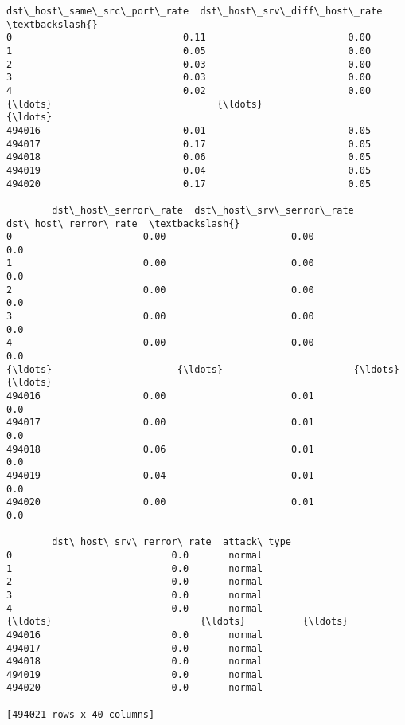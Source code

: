 \documentclass[11pt]{article}
\begin{document}
\begin{tcolorbox}[breakable, size=fbox, boxrule=.5pt, pad at break*=1mm, opacityfill=0]
\begin{Verbatim}[commandchars=\\\{\}]
        dst\_host\_same\_src\_port\_rate  dst\_host\_srv\_diff\_host\_rate  \textbackslash{}
0                              0.11                         0.00
1                              0.05                         0.00
2                              0.03                         0.00
3                              0.03                         0.00
4                              0.02                         0.00
{\ldots}                             {\ldots}                          {\ldots}
494016                         0.01                         0.05
494017                         0.17                         0.05
494018                         0.06                         0.05
494019                         0.04                         0.05
494020                         0.17                         0.05

        dst\_host\_serror\_rate  dst\_host\_srv\_serror\_rate  dst\_host\_rerror\_rate  \textbackslash{}
0                       0.00                      0.00                   0.0
1                       0.00                      0.00                   0.0
2                       0.00                      0.00                   0.0
3                       0.00                      0.00                   0.0
4                       0.00                      0.00                   0.0
{\ldots}                      {\ldots}                       {\ldots}                   {\ldots}
494016                  0.00                      0.01                   0.0
494017                  0.00                      0.01                   0.0
494018                  0.06                      0.01                   0.0
494019                  0.04                      0.01                   0.0
494020                  0.00                      0.01                   0.0

        dst\_host\_srv\_rerror\_rate  attack\_type
0                            0.0       normal
1                            0.0       normal
2                            0.0       normal
3                            0.0       normal
4                            0.0       normal
{\ldots}                          {\ldots}          {\ldots}
494016                       0.0       normal
494017                       0.0       normal
494018                       0.0       normal
494019                       0.0       normal
494020                       0.0       normal

[494021 rows x 40 columns]
\end{Verbatim}
\end{tcolorbox}
        
\end{document}
